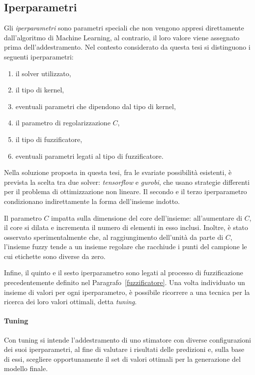 \documentclass[12pt]{report}
\theoremstyle{definition}
\begin{document}
\subsection{Iperparametri}\label{hyperparameters}
Gli \textit{iperparametri} sono parametri speciali che non vengono appresi direttamente dall'algoritmo di Machine Learning, al contrario, il loro valore viene assegnato prima dell'addestramento.
Nel contesto considerato da questa tesi si distinguono i seguenti iperparametri: 
\begin{enumerate}
    \item il solver utilizzato,
    \item il tipo di kernel,
    \item eventuali parametri che dipendono dal tipo di kernel,
    \item il parametro di regolarizzazione $C$,
    \item il tipo di fuzzificatore,
    \item eventuali parametri legati al tipo di fuzzificatore.
\end{enumerate}
Nella soluzione proposta in questa tesi, fra le svariate possibilità esistenti, è prevista la scelta tra due solver: \textit{tensorflow} e \textit{gurobi}, che usano strategie differenti per il problema di ottimizzazione non lineare. Il secondo e il terzo iperparametro condizionano indirettamente la forma dell'insieme indotto.

Il parametro $C$ impatta sulla dimensione del core dell'insieme:
all'aumentare di $C$, il core si dilata e incrementa il numero di elementi in esso inclusi.
Inoltre, è stato osservato sperimentalmente che, al raggiungimento dell'unità da parte di $C$, l'insieme fuzzy tende a un insieme regolare che racchiude i punti del campione le cui etichette sono diverse da zero.

Infine, il quinto e il sesto iperparametro sono legati al processo di fuzzificazione precedentemente definito nel Paragrafo~\ref{fuzzificatore}.
Una volta individuato un insieme di valori per ogni iperparametro, è possibile ricorrere a una tecnica per la ricerca dei loro valori ottimali, detta \textit{tuning}.

\paragraph{Tuning} Con tuning si intende l'addestramento di uno stimatore con diverse configurazioni dei suoi iperparametri, al fine di valutare i risultati delle predizioni e, sulla base di essi, scegliere opportunamente il set di valori ottimali per la generazione del modello finale.
\end{document}
